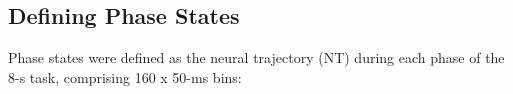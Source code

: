 











\subsection{Defining Phase States}
Phase states were defined as the neural trajectory (NT) during each phase of the 8-s task, comprising 160 x 50-ms bins:

